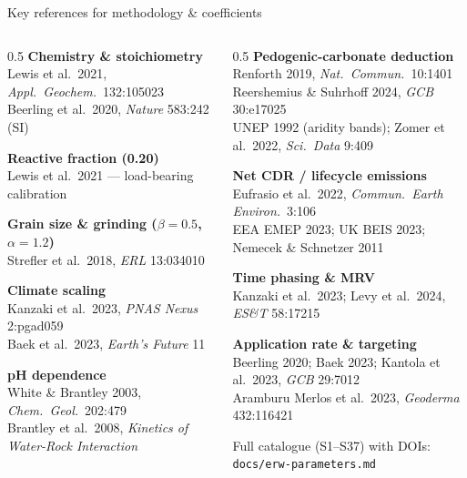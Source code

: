 \documentclass[aspectratio=169,10pt]{beamer}
\begin{document}
\begin{frame}{Key references for methodology \& coefficients}
\scriptsize

\begin{columns}[T]
\begin{column}{0.5\textwidth}
\textbf{Chemistry \& stoichiometry}\\
Lewis et al.\ 2021, \emph{Appl.\ Geochem.}\ 132:105023 \\
Beerling et al.\ 2020, \emph{Nature} 583:242 (SI)

\medskip
\textbf{Reactive fraction (0.20)}\\
Lewis et al.\ 2021 --- load-bearing calibration

\medskip
\textbf{Grain size \& grinding ($\beta{=}0.5$, $\alpha{=}1.2$)}\\
Strefler et al.\ 2018, \emph{ERL} 13:034010

\medskip
\textbf{Climate scaling}\\
Kanzaki et al.\ 2023, \emph{PNAS Nexus} 2:pgad059 \\
Baek et al.\ 2023, \emph{Earth's Future} 11

\medskip
\textbf{pH dependence}\\
White \& Brantley 2003, \emph{Chem.\ Geol.}\ 202:479 \\
Brantley et al.\ 2008, \emph{Kinetics of Water-Rock Interaction}
\end{column}

\begin{column}{0.5\textwidth}
\textbf{Pedogenic-carbonate deduction}\\
Renforth 2019, \emph{Nat.\ Commun.}\ 10:1401 \\
Reershemius \& Suhrhoff 2024, \emph{GCB} 30:e17025 \\
UNEP 1992 (aridity bands); Zomer et al.\ 2022, \emph{Sci.\ Data} 9:409

\medskip
\textbf{Net CDR / lifecycle emissions}\\
Eufrasio et al.\ 2022, \emph{Commun.\ Earth Environ.}\ 3:106 \\
EEA EMEP 2023; UK BEIS 2023; Nemecek \& Schnetzer 2011

\medskip
\textbf{Time phasing \& MRV}\\
Kanzaki et al.\ 2023; Levy et al.\ 2024, \emph{ES\&T} 58:17215

\medskip
\textbf{Application rate \& targeting}\\
Beerling 2020; Baek 2023; Kantola et al.\ 2023, \emph{GCB} 29:7012 \\
Aramburu Merlos et al.\ 2023, \emph{Geoderma} 432:116421

\vspace{1em}
\textcolor{erwgreen}{Full catalogue (S1--S37) with DOIs: \texttt{docs/erw-parameters.md}}
\end{column}
\end{columns}

\end{frame}
\end{document}
